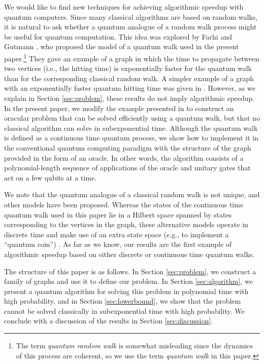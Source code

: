 \documentclass[aps,11pt,twoside,nofootinbib,tightenlines,superscriptaddress,preprintnumbers]{revtex4}
\newcommand{\<}{\langle}
\renewcommand{\>}{\rangle}
\begin{document}
We would like to find new techniques for achieving algorithmic speedup
with quantum computers.  Since many classical algorithms are based on
random walks, it is natural to ask whether a quantum analogue of a random
walk process might be useful for quantum computation.  This idea was
explored by Farhi and Gutmann \cite{FG98}, who proposed the model of a
quantum walk used in the present paper.\footnote{The term {\em quantum
random walk} is somewhat misleading since the dynamics of this process are
coherent, so we use the term {\em quantum walk} in this paper.}  They gave
an example of a graph in which the time to propagate between two vertices
(i.e., the hitting time) is exponentially faster for the quantum walk than
for the corresponding classical random walk.  A simpler example of a graph
with an exponentially faster quantum hitting time was given in
\cite{CFG02}.  However, as we explain in Section \ref{sec:problem}, these
results do not imply algorithmic speedup.  In the present paper, we modify
the example presented in \cite{CFG02} to construct an oracular problem
that can be solved efficiently using a quantum walk, but that no classical
algorithm can solve in subexponential time.  Although the quantum walk is
defined as a continuous time quantum process, we show how to implement it
in the conventional quantum computing paradigm with the structure of the
graph provided in the form of an oracle.  In other words, the algorithm
consists of a polynomial-length sequence of applications of the oracle and
unitary gates that act on a few qubits at a time.

We note that the quantum analogue of a classical random walk is not
unique, and other models have been proposed.  Whereas the states of the
continuous time quantum walk used in this paper lie in a Hilbert space
spanned by states corresponding to the vertices in the graph, these
alternative models operate in discrete time and make use of an extra state
space (e.g., to implement a ``quantum coin'')
\cite{ADZ93,Mey96,Wat01b,AAKV01,NV01}.  As far as we know, our results are
the first example of algorithmic speedup based on either discrete or
continuous time quantum walks.

The structure of this paper is as follows.  In Section \ref{sec:problem},
we construct a family of graphs and use it to define our problem.  In
Section \ref{sec:algorithm}, we present a quantum algorithm for solving
this problem in polynomial time with high probability, and in Section
\ref{sec:lowerbound}, we show that the problem cannot be solved
classically in subexponential time with high probability.  We conclude
with a discussion of the results in Section \ref{sec:discussion}.
\end{document}
